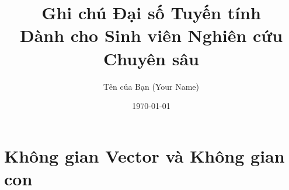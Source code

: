\documentclass[12pt, a4paper, oneside]{book}
\title{Ghi chú Đại số Tuyến tính \\ \large Dành cho Sinh viên Nghiên cứu Chuyên sâu}
\author{Tên của Bạn (Your Name)}
\date{\today}
\begin{document}
\frontmatter 
\maketitle   %
\tableofcontents %

\mainmatter 

\chapter{Không gian Vector và Không gian con}


%


\end{document}
